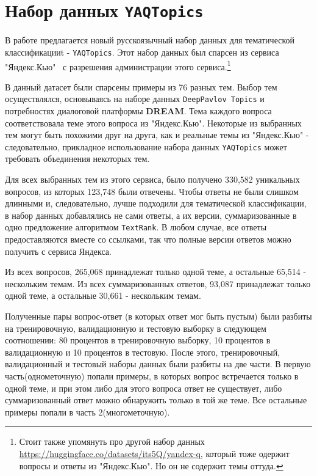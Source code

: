 \section{Набор данных \texttt{YAQTopics}} 

В работе предлагается новый русскоязычный набор данных для тематической классификацииt - \texttt{YAQTopics}. Этот набор данных был спарсен из сервиса "Яндекс.Кью"~\cite{yandex_q} с разрешения администрации этого сервиса.\footnote{Стоит также упомянуть про другой набор данных \url{https://huggingface.co/datasets/its5Q/yandex-q}, который тоже одержит вопросы и ответы из "Яндекс.Кью". Но он не содержит темы оттуда.}

В данный датасет были спарсены примеры из 76 разных тем. Выбор тем осуществлялся, основываясь на наборе данных \texttt{DeepPavlov Topics} и потребностях диалоговой платформы \textbf{DREAM}. Тема каждого вопроса соответствовала теме этого вопроса из "Яндекс.Кью". Некоторые из выбранных тем могут быть похожими друг на друга, как и реальные темы из "Яндекс.Кью" - следовательно, прикладное использование набора данных \texttt{YAQTopics} может требовать объединения некоторых тем. 


Для всех выбранных тем из этого сервиса, было получено 330,582 уникальных вопросов, из которых 123,748 были отвечены. Чтобы ответы не были слишком длинными и, следовательно, лучше подходили для тематической классификации, в набор данных добавлялись не сами ответы, а их версии, суммаризованные в одно предложение алгоритмом \texttt{TextRank}. В любом случае, все ответы предоставляются вместе со ссылками, так что полные версии ответов можно получить с сервиса Яндекса.

Из всех вопросов, 265,068 принадлежат только одной теме, а остальные 65,514 - нескольким темам. Из всех суммаризованных ответов, 93,087 принадлежат только одной теме, а остальные 30,661 - нескольким темам.

Полученные пары вопрос-ответ (в которых ответ мог быть пустым) были разбиты на тренировочную, валидационную и тестовую выборку в следующем соотношении: 80 процентов в тренировочную выборку, 10 процентов в валидационную и 10 процентов в тестовую. После этого, тренировочный, валидационный и тестовый наборы данных были разбиты на две части. В первую часть(однометочную) попали примеры, в которых вопрос встречается только в одной теме, и при этом либо для этого вопроса ответ не существует, либо суммаризованный ответ можно обнаружить только в той же теме. Все остальные примеры попали в часть 2(многометочную).

